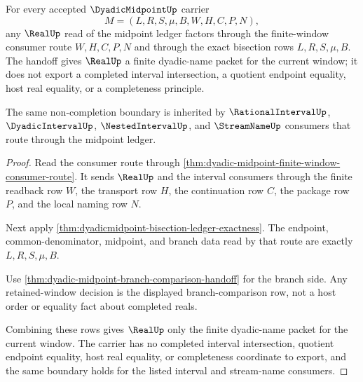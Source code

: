 \begin{theorem}
\label{thm:dyadic-midpoint-real-handoff-noncompletion}
For every accepted $\DyadicMidpointUp$ carrier
$$
M=(L,R,S,\mu,B,W,H,C,P,N),
$$
any $\RealUp$ read of the midpoint ledger factors through the finite-window consumer route $W,H,C,P,N$ and through the exact bisection rows $L,R,S,\mu,B$. The handoff gives $\RealUp$ a finite dyadic-name packet for the current window; it does not export a completed interval intersection, a quotient endpoint equality, host real equality, or a completeness principle.

The same non-completion boundary is inherited by $\RationalIntervalUp$, $\DyadicIntervalUp$, $\NestedIntervalUp$, and $\StreamNameUp$ consumers that route through the midpoint ledger.
\end{theorem}
\begin{proof}
Read the consumer route through \autoref{thm:dyadic-midpoint-finite-window-consumer-route}. It sends $\RealUp$ and the interval consumers through the finite readback row $W$, the transport row $H$, the continuation row $C$, the package row $P$, and the local naming row $N$.

Next apply \autoref{thm:dyadicmidpoint-bisection-ledger-exactness}. The endpoint, common-denominator, midpoint, and branch data read by that route are exactly $L,R,S,\mu,B$.

Use \autoref{thm:dyadic-midpoint-branch-comparison-handoff} for the branch side. Any retained-window decision is the displayed branch-comparison row, not a host order or equality fact about completed reals.

Combining these rows gives $\RealUp$ only the finite dyadic-name packet for the current window. The carrier has no completed interval intersection, quotient endpoint equality, host real equality, or completeness coordinate to export, and the same boundary holds for the listed interval and stream-name consumers.
\end{proof}

